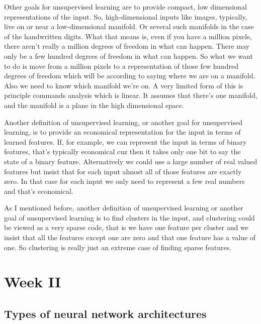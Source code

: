 \begin{multicols}{2}
\begin{footnotesize}
Other goals for unsupervised learning are to provide compact, low dimensional representations of the input. So, high-dimensional inputs like images, typically, live on or near a low-dimensional manifold. Or several such manifolds in the case of the handwritten digits. What that means is, even if you have a million pixels, there aren't really a million degrees of freedom in what can happen. There may only be a few hundred degrees of freedom in what can happen. So what we want to do is move from a million pixels to a representation of those few hundred degrees of freedom which will be according to saying where we are on a manifold. Also we need to know which manifold we're on. A very limited form of this is principle commands analysis which is linear. It assumes that there's one manifold, and the manifold is a plane in the high dimensional space.

Another definition of unsupervised learning, or another goal for unsupervised learning, is to provide an economical representation for the input in terms of learned features. If, for example, we can represent the input in terms of binary features, that's typically economical cuz then it takes only one bit to say the state of a binary feature. Alternatively we could use a large number of real valued features but insist that for each input almost all of those features are exactly zero. In that case for each input we only need to represent a few real numbers and that's economical.

As I mentioned before, another definition of unsupervised learning or another goal of unsupervised learning is to find clusters in the input, and clustering could be viewed as a very sparse code, that is we have one feature per cluster and we insist that all the features except one are zero and that one feature has a value of one. So clustering is really just an extreme case of finding sparse features.
\end{footnotesize}
\end{multicols}


\section{Week II}


\subsection{Types of neural network architectures}

